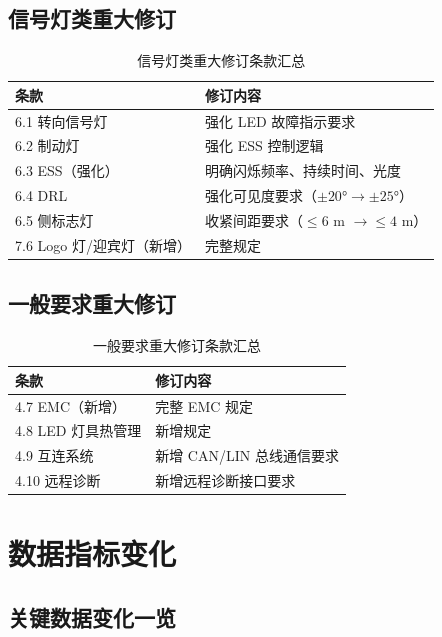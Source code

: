 \subsection{信号灯类重大修订}

\begin{table}[H]
\centering
\caption{信号灯类重大修订条款汇总}
\small
\begin{tabularx}{\textwidth}{|l|X|}
\hline
\textbf{条款} & \textbf{修订内容} \\
\hline
6.1 转向信号灯   & 强化 LED 故障指示要求 \\
\hline
6.2 制动灯       & 强化 ESS 控制逻辑 \\
\hline
6.3 ESS（强化）  & 明确闪烁频率、持续时间、光度 \\
\hline
6.4 DRL          & 强化可见度要求（$\pm 20° \to \pm 25°$） \\
\hline
6.5 侧标志灯    & 收紧间距要求（$\le 6$ m $\to \le 4$ m） \\
\hline
7.6 Logo 灯/迎宾灯（新增）& 完整规定 \\
\hline
\end{tabularx}
\end{table}

\subsection{一般要求重大修订}

\begin{table}[H]
\centering
\caption{一般要求重大修订条款汇总}
\small
\begin{tabularx}{\textwidth}{|l|X|}
\hline
\textbf{条款} & \textbf{修订内容} \\
\hline
4.7 EMC（新增） & 完整 EMC 规定 \\
\hline
4.8 LED 灯具热管理 & 新增规定 \\
\hline
4.9 互连系统   & 新增 CAN/LIN 总线通信要求 \\
\hline
4.10 远程诊断  & 新增远程诊断接口要求 \\
\hline
\end{tabularx}
\end{table}

\section{数据指标变化}

\subsection{关键数据变化一览}

